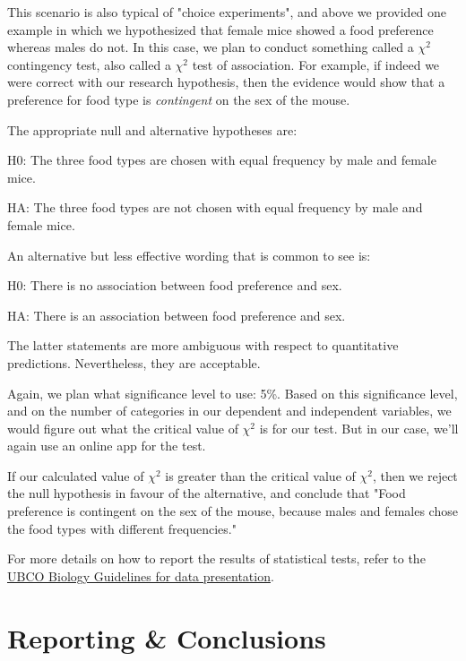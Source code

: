 \documentclass[
]{book}
\begin{document}
This scenario is also typical of "choice experiments", and above we provided one example in which we hypothesized that female mice showed a food preference whereas males do not. In this case, we plan to conduct something called a \(\chi{^2}\) contingency test, also called a \(\chi{^2}\) test of association. For example, if indeed we were correct with our research hypothesis, then the evidence would show that a preference for food type is \emph{contingent} on the sex of the mouse.

The appropriate null and alternative hypotheses are:

H0: The three food types are chosen with equal frequency by male and female mice.

HA: The three food types are not chosen with equal frequency by male and female mice.

An alternative but less effective wording that is common to see is:

H0: There is no association between food preference and sex.

HA: There is an association between food preference and sex.

The latter statements are more ambiguous with respect to quantitative predictions. Nevertheless, they are acceptable.

Again, we plan what significance level to use: 5\%. Based on this significance level, and on the number of categories in our dependent and independent variables, we would figure out what the critical value of \(\chi{^2}\) is for our test. But in our case, we'll again use an online app for the test.

If our calculated value of \(\chi{^2}\) is greater than the critical value of \(\chi{^2}\), then we reject the null hypothesis in favour of the alternative, and conclude that "Food preference is contingent on the sex of the mouse, because males and females chose the food types with different frequencies."

For more details on how to report the results of statistical tests, refer to the \href{https://ubco-biology.github.io/Procedures-and-Guidelines/descriptive-summary-statistics.html}{UBCO Biology Guidelines for data presentation}.

\hypertarget{reporting-conclusions}{%
\section{Reporting \& Conclusions}\label{reporting-conclusions}}
\end{document}
